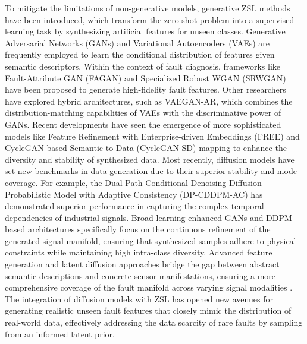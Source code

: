 To mitigate the limitations of non-generative models, generative ZSL methods have been introduced, which transform the zero-shot problem into a supervised learning task by synthesizing artificial features for unseen classes. Generative Adversarial Networks (GANs) and Variational Autoencoders (VAEs) are frequently employed to learn the conditional distribution of features given semantic descriptors. Within the context of fault diagnosis, frameworks like Fault-Attribute GAN (FAGAN) and Specialized Robust WGAN (SRWGAN) have been proposed to generate high-fidelity fault features. Other researchers have explored hybrid architectures, such as VAEGAN-AR, which combines the distribution-matching capabilities of VAEs with the discriminative power of GANs. Recent developments have seen the emergence of more sophisticated models like Feature Refinement with Enterprise-driven Embeddings (FREE) and CycleGAN-based Semantic-to-Data (CycleGAN-SD) mapping to enhance the diversity and stability of synthesized data. Most recently, diffusion models have set new benchmarks in data generation due to their superior stability and mode coverage. For example, the Dual-Path Conditional Denoising Diffusion Probabilistic Model with Adaptive Consistency (DP-CDDPM-AC) has demonstrated superior performance in capturing the complex temporal dependencies of industrial signals. Broad-learning enhanced GANs and DDPM-based architectures specifically focus on the continuous refinement of the generated signal manifold, ensuring that synthesized samples adhere to physical constraints while maintaining high intra-class diversity. Advanced feature generation and latent diffusion approaches bridge the gap between abstract semantic descriptions and concrete sensor manifestations, ensuring a more comprehensive coverage of the fault manifold across varying signal modalities \cite{Mu2025physical, Ma2024broad, Wu2024DDPM, Qin2024diffusion, Chen2024featureGen, Li2024diffusionTIM, GZSLCFD2024, DPCDDPMAC2024}. The integration of diffusion models with ZSL has opened new avenues for generating realistic unseen fault features that closely mimic the distribution of real-world data, effectively addressing the data scarcity of rare faults by sampling from an informed latent prior.

